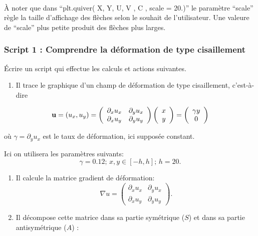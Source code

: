 \documentclass{article}
\begin{document}
    \begin{center}
    \end{center}
    { \hspace*{\fill} \\}
    
    À noter que dans ``plt.quiver( X, Y, U, V , C , scale = 20.)'' le
paramètre ``scale'' règle la taille d'affichage des flèches selon le
souhait de l'utilisateur. Une valeure de ``scale'' plus petite produit
des flèches plus larges.


    \subsubsection{Script 1 : Comprendre la déformation de type cisaillement}


    Écrire un script qui effectue les calculs et actions suivantes.

\begin{enumerate}
\def\labelenumi{\alph{enumi})}
\itemsep1pt\parskip0pt
\item
  Il trace le graphique d'un champ de déformation de type cisaillement,
  c'est-à-dire
\end{enumerate}

\[ {\bf u} = (u_x, u_y) = \left( \begin{array}{cc}
\partial_x u_x  & \partial_y u_x \\
\partial_x u_y  & \partial_y u_y \end{array} \right) 
\left( \begin{array}{c}
x   \\
y  \end{array} \right)=  
\left( \begin{array}{c}
\gamma y   \\
0  \end{array} \right)\]

où \(\gamma = \partial_y u_x\) est le taux de déformation, ici supposée
constant.

Ici on utilisera les paramètres suivants: \[
\gamma = 0.12; \, x,y \in [-h,h]; \, h = 20.
\]

\begin{enumerate}
\def\labelenumi{\alph{enumi})}
\setcounter{enumi}{1}
\item
  Il calcule la matrice gradient de déformation:
  \[ \nabla u =  \left( \begin{array}{cc}
  \partial_x u_x & \partial_y u_x  \\
  \partial_x u_y & \partial_y u_y \end{array} \right). \]
\item
  Il décompose cette matrice dans sa partie symétrique (\(S\)) et dans
  sa partie antisymétrique (\(A\)) :
\end{enumerate}
\end{document}
